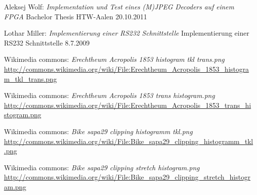 \documentclass[%
  paper=A4, %
  pagesize, %
  12pt,
  ngerman   %
]{scrreprt}  %
\begin{document}
\renewcommand\bibname{Quellenverzeichnis}
\begin{thebibliography}{99}
 Aleksej Wolf:
 \emph{Implementation und Test eines (M)JPEG Decoders auf einem FPGA}
 Bachelor Thesis
 HTW-Aalen
 20.10.2011
 
 Lothar Miller:
 \emph{Implementierung einer RS232 Schnittstelle}
 Implementierung einer RS232 Schnittstelle
 8.7.2009
 
 Wikimedia commons:
 \emph{Erechtheum Acropolis 1853 histogram tkl trans.png}
 \url{http://commons.wikimedia.org/wiki/File:Erechtheum_Acropolis_1853_histogram_tkl_trans.png}
 
 Wikimedia commons:
 \emph{Erechtheum Acropolis 1853 trans histogram.png}
 \url{http://commons.wikimedia.org/wiki/File:Erechtheum_Acropolis_1853_trans_histogram.png}
 
 Wikimedia commons:
 \emph{Bike sapa29 clipping histogramm tkl.png}
 \url{http://commons.wikimedia.org/wiki/File:Bike_sapa29_clipping_histogramm_tkl.png}
 
 Wikimedia commons:
 \emph{Bike sapa29 clipping stretch histogram.png}
 \url{http://commons.wikimedia.org/wiki/File:Bike_sapa29_clipping_stretch_histogram.png}
 
\end{thebibliography}
\end{document}
